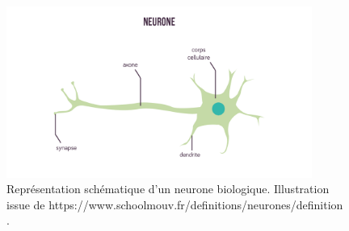\begin{figure}
  \centering
  \includegraphics[width=10cm]{./Chapitre2/figures/neuroneBio.png}
  \caption{Représentation schématique d'un neurone biologique. Illustration issue de https://www.schoolmouv.fr/definitions/neurones/definition .}
  \label{fig:neuroneBio}
\end{figure}
